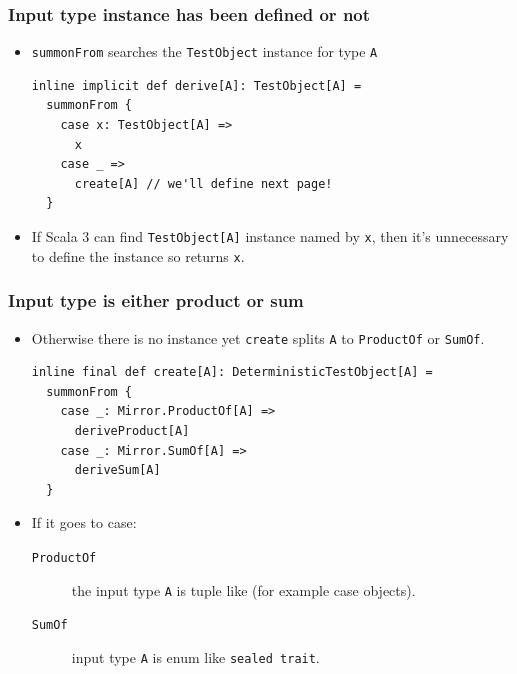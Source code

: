 \begin{frame}[fragile]
  \frametitle{ Input type instance has been defined or not}

  \begin{itemize}
    \item \lstinline|summonFrom| searches the \lstinline|TestObject| instance for type \lstinline|A|
\begin{lstlisting}[style=scala]
inline implicit def derive[A]: TestObject[A] =
  summonFrom {
    case x: TestObject[A] =>
      x
    case _ =>
      create[A] // we'll define next page!
  }
\end{lstlisting}

    \item If Scala 3 can find \lstinline|TestObject[A]| instance named by \lstinline|x|, then
    it's unnecessary to define the instance so returns \lstinline|x|.
  \end{itemize}
\end{frame}

\begin{frame}[fragile]
  \frametitle{ Input type is either product or sum}

  \begin{itemize}
    \item Otherwise there is no instance yet \lstinline|create| splits \lstinline|A| to
    \lstinline|ProductOf| or \lstinline|SumOf|.
\begin{lstlisting}[style=scala]
inline final def create[A]: DeterministicTestObject[A] =
  summonFrom {
    case _: Mirror.ProductOf[A] =>
      deriveProduct[A]
    case _: Mirror.SumOf[A] =>
      deriveSum[A]
  }
\end{lstlisting}

    \item If it goes to case:
    \begin{description}
      \item[\texttt{ProductOf}] the input type \lstinline|A| is
      tuple like (for example case objects).
      
      \item[\texttt{SumOf}] input type \lstinline|A| is enum like
      \lstinline|sealed trait|.
    \end{description}
  \end{itemize}
\end{frame}

